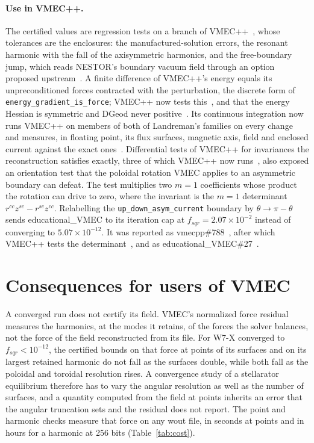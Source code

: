 \documentclass[11pt]{article}
\newcommand{\code}[1]{\texttt{#1}}
\begin{document}
\paragraph{Use in VMEC++.}
The certified values are regression tests on a branch of VMEC++~\cite{branch},
whose tolerances are the enclosures: the manufactured-solution errors, the
resonant harmonic with the fall of the axisymmetric harmonics, and the
free-boundary jump, which reads NESTOR's boundary vacuum field through an option
proposed upstream~\cite{pr903}. A finite difference of VMEC++'s energy equals
its unpreconditioned forces contracted with the perturbation, the discrete form
of \code{energy\_gradient\_is\_force}; VMEC++ now tests this~\cite{pr905}, and
that the energy Hessian is symmetric and DGeod never positive~\cite{pr904}. Its
continuous integration now runs VMEC++ on members of both of Landreman's
families on every change and measures, in floating point, its flux surfaces,
magnetic axis, field and enclosed current against the exact
ones~\cite{pr912}.
Differential tests of VMEC++ for invariances the
reconstruction satisfies exactly, three of which VMEC++ now runs~\cite{pr875},
also exposed an orientation test that the poloidal rotation VMEC applies to an
asymmetric boundary can defeat. The test multiplies two $m=1$ coefficients whose
product the rotation can drive to zero, where the invariant is the $m=1$
determinant $r^{cc}z^{sc}-r^{sc}z^{cc}$. Relabelling the
\code{up\_down\_asym\_current} boundary by $\theta\to\pi-\theta$ sends
educational\_VMEC to its iteration cap at $f_{sqr}=2.07\times10^{-2}$ instead of
converging to $5.07\times10^{-12}$. It was reported as
vmecpp\#788~\cite{issue788}, after which VMEC++ tests the
determinant~\cite{pr789}, and as educational\_VMEC\#27~\cite{issue27}.

\section{Consequences for users of VMEC}\label{sec:users}

A converged run does not certify its field. VMEC's normalized force residual
measures the harmonics, at the modes it retains, of the forces the solver
balances, not the force of the field reconstructed from its file. For W7-X
converged to $f_{sqr}<10^{-12}$, the certified bounds on that force at points
of its surfaces and on its largest retained harmonic do not fall as the
surfaces double, while both fall as the poloidal and toroidal resolution rises.
A convergence study of
a stellarator equilibrium therefore has to vary the angular resolution as well
as the number of surfaces, and a quantity computed from the field at points
inherits an error that the angular truncation sets and the residual does not
report. The point and harmonic checks measure that force on any wout file, in
seconds at points and in hours for a harmonic at 256 bits
(Table~\ref{tab:cost}).
\end{document}
